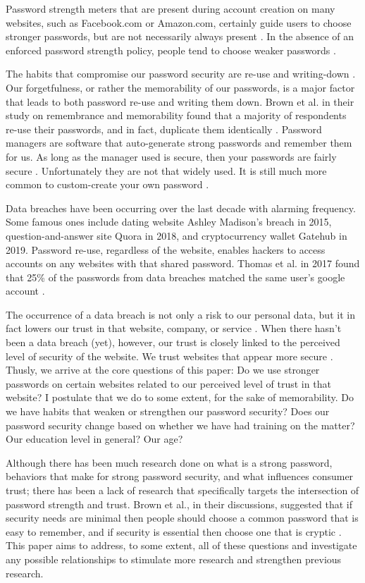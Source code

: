\documentclass[letterpaper, 10 pt, conference]{ieeeconf}  %
\begin{document}
Password strength meters that are present during account creation on many websites, such as Facebook.com or Amazon.com, certainly guide users to choose stronger passwords, but are not necessarily always present \cite{DeCarnavalet2014}. In the absence of an enforced password strength policy, people tend to choose weaker passwords \cite{DellAmico2010}. 

The habits that compromise our password security are re-use and writing-down \cite{Dhamija2000}. Our forgetfulness, or rather the memorability of our passwords, is a major factor that leads to both password re-use and writing them down. Brown et al. in their study on remembrance and memorability found that a majority of respondents re-use their passwords, and in fact, duplicate them identically \cite{Brown2004}. Password managers are software that auto-generate strong passwords and remember them for us. As long as the manager used is secure, then your passwords are fairly secure \cite{Alkadi2016}. Unfortunately they are not that widely used. It is still much more common to custom-create your own password \cite{Alkadi2016}.

Data breaches have been occurring over the last decade with alarming frequency. Some famous ones include dating website Ashley Madison’s breach in 2015, question-and-answer site Quora in 2018, and cryptocurrency wallet Gatehub in 2019. Password re-use, regardless of the website, enables hackers to access accounts on any websites with that shared password. Thomas et al. in 2017 found that 25\% of the passwords from data breaches matched the same user’s google account \cite{Thomas2017}. 

The occurrence of a data breach is not only a risk to our personal data, but it in fact lowers our trust in that website, company, or service \cite{Curtis2018}. When there hasn’t been a data breach (yet), however, our trust is closely linked to the perceived level of security of the website. We trust websites that appear more secure \cite{Flavian2006}.
Thusly, we arrive at the core questions of this paper: Do we use stronger passwords on certain websites related to our perceived level of trust in that website? I postulate that we do to some extent, for the sake of memorability. Do we have habits that weaken or strengthen our password security? Does our password security change based on whether we have had training on the matter? Our education level in general? Our age? 

Although there has been much research done on what is a strong password, behaviors that make for strong password security, and what influences consumer trust; there has been a lack of research that specifically targets the intersection of password strength and trust. Brown et al., in their discussions, suggested that if security needs are minimal then people should choose a common password that is easy to remember, and if security is essential then choose one that is cryptic \cite{Brown2004}. This paper aims to address, to some extent, all of these questions and investigate any possible relationships to stimulate more research and strengthen previous research.
\end{document}
